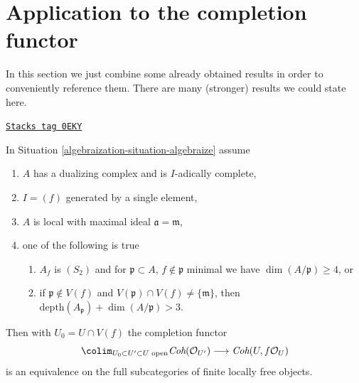 \section{Application to the completion functor}
\label{algebraization-section-completion-application}
In this section we just combine some already obtained results
in order to conveniently reference them. There are many
(stronger) results we could state here.

\begin{lemma}
\label{algebraization-lemma-equivalence-better}
\href{https://stacks.math.columbia.edu/tag/0EKY}{\texttt{Stacks tag 0EKY}}

In Situation \ref{algebraization-situation-algebraize} assume
\begin{enumerate}
\item $A$ has a dualizing complex and is $I$-adically complete,
\item $I = (f)$ generated by a single element,
\item $A$ is local with maximal ideal $\mathfrak a = \mathfrak m$,
\item one of the following is true
\begin{enumerate}
\item $A_f$ is $(S_2)$ and for $\mathfrak p \subset A$,
$f \not \in \mathfrak p$ minimal we have $\dim(A/\mathfrak p) \geq 4$, or
\item if $\mathfrak p \not \in V(f)$ and
$V(\mathfrak p) \cap V(f) \not = \{\mathfrak m\}$, then
$\text{depth}(A_\mathfrak p) + \dim(A/\mathfrak p) > 3$.
\end{enumerate}
\end{enumerate}
Then with $U_0 = U \cap V(f)$ the completion functor
$$
\colim_{U_0 \subset U' \subset U\text{ open}}
\textit{Coh}(\mathcal{O}_{U'})
\longrightarrow
\textit{Coh}(U, f\mathcal{O}_U)
$$
is an equivalence on the full subcategories of finite locally free objects.
\end{lemma}

